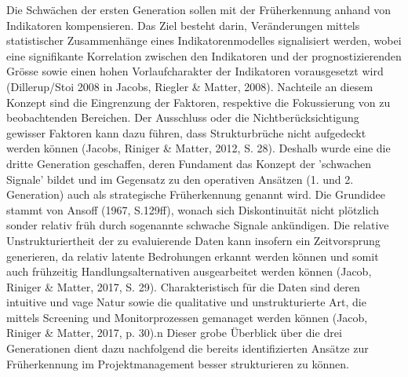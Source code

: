 \newline
Die Schwächen der ersten Generation sollen mit der Früherkennung anhand von Indikatoren kompensieren. Das Ziel besteht darin, Veränderungen mittels statistischer Zusammenhänge eines Indikatorenmodelles signalisiert werden, wobei eine signifikante Korrelation zwischen den Indikatoren und der prognostizierenden Grösse sowie einen hohen Vorlaufcharakter der Indikatoren vorausgesetzt wird (Dillerup/Stoi 2008 in Jacobs, Riegler \& Matter, 2008). Nachteile an diesem Konzept sind die Eingrenzung der Faktoren, respektive die Fokussierung von zu beobachtenden Bereichen. Der Ausschluss oder die Nichtberücksichtigung gewisser Faktoren kann dazu führen, dass Strukturbrüche nicht aufgedeckt werden können (Jacobs, Riniger \& Matter, 2012, S. 28).
\newline Deshalb wurde eine die dritte Generation geschaffen, deren Fundament das Konzept der 'schwachen Signale' bildet und im Gegensatz zu den operativen Ansätzen (1. und 2. Generation) auch als strategische Früherkennung genannt wird. Die Grundidee stammt von Ansoff (1967, S.129ff), wonach sich Diskontinuität nicht plötzlich sonder relativ früh durch sogenannte schwache Signale ankündigen. Die relative Unstrukturiertheit der zu evaluierende Daten kann insofern ein Zeitvorsprung generieren, da relativ latente Bedrohungen erkannt werden können und somit auch frühzeitig Handlungsalternativen ausgearbeitet werden können (Jacob, Riniger \& Matter, 2017, S. 29). Charakteristisch für die Daten sind deren intuitive und vage Natur sowie die qualitative und unstrukturierte Art, die mittels Screening und Monitorprozessen gemanaget werden können (Jacob, Riniger \& Matter, 2017, p. 30).n
\newline Dieser grobe Überblick über die drei Generationen dient dazu nachfolgend die bereits identifizierten Ansätze zur Früherkennung im Projektmanagement besser strukturieren zu können. 
